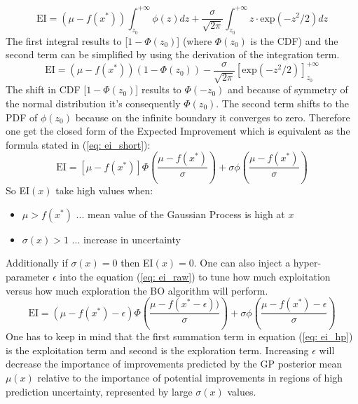 \documentclass[12pt, a4paper]{article}
\begin{document}
\begin{equation}
    \text{EI} = (\mu - f(x^{\ast})) \int_{z_0}^{+ \infty} \phi(z) dz + \frac{\sigma}{\sqrt{2\pi}}\int_{z_0}^{+ \infty} z \cdot \text{exp}(-z^2/2) dz
\end{equation}
The first integral results to [$1 - \Phi(z_0)$] (where $\Phi(z_0)$ is the CDF) and the second term can be simplified by using the derivation of the integration term.
\begin{equation}
    \text{EI} = (\mu - f(x^{\ast})) (1 - \Phi(z_0)) - \frac{\sigma}{\sqrt{2\pi}} [\text{exp}(-z^2/2)]_{z_0}^{+ \infty}
\end{equation}
The shift in CDF [$1 - \Phi(z_0)$] results to $\Phi(- z_0)$ and because of symmetry of the normal distribution it's consequently $\Phi(z_0)$. The second term shifts to the PDF of $\phi(z_0)$ because on the infinite boundary it converges to zero.
Therefore one get the closed form of the Expected Improvement which is equivalent as the formula stated in (\ref{eq: ei_short}):
\begin{equation}
\label{eq: ei_raw}
    \text{EI} = [\mu - f(x^{\ast})] \Phi(\frac{\mu - f(x^{\ast})}{\sigma}) + \sigma \phi(\frac{\mu - f(x^{\ast})}{\sigma})
\end{equation}
So EI$(x)$ take high values when:
\begin{itemize}
    \item $\mu > f(x^{\ast})$ ... mean value of the Gaussian Process is high at $x$
    \item $\sigma(x) > 1$ ... increase in uncertainty
\end{itemize}
Additionally if $\sigma(x) = 0$ then EI$(x) = 0$.
One can also inject a hyper-parameter $\epsilon$ into the equation (\ref{eq: ei_raw}) to tune how much exploitation versus how much exploration the BO algorithm will perform.
\begin{equation}
\label{eq: ei_hp}
        \text{EI} = (\mu - f(x^{\ast}) - \epsilon) \Phi(\frac{\mu - f(x^{\ast} - \epsilon))}{\sigma}) + \sigma \phi(\frac{\mu - f(x^{\ast}) - \epsilon}{\sigma})
\end{equation} 
One has to keep in mind that the first summation term in equation (\ref{eq: ei_hp}) is the exploitation term and second is the exploration term. Increasing $\epsilon$ will decrease the importance of improvements predicted by the GP posterior mean $\mu(x)$ relative to the importance of potential improvements in regions of high prediction uncertainty, represented by large $\sigma(x)$ values.
\end{document}
